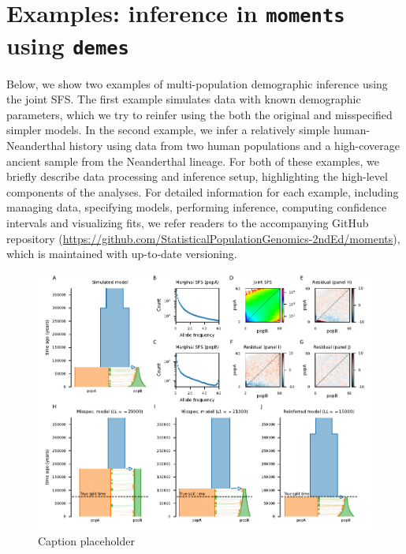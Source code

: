 \documentclass[]{article}
\newcommand{\moments}{\texttt{moments}\xspace}
\newcommand{\demes}{\texttt{demes}\xspace}
\begin{document}
\section*{Examples: inference in \moments using \demes}

Below, we show two examples of multi-population demographic inference using the
joint SFS. The first example simulates data with known demographic parameters,
which we try to reinfer using the both the original and misspecified simpler
models. In the second example, we infer a relatively simple human-Neanderthal
history using data from two human populations and a high-coverage ancient
sample from the Neanderthal lineage. For both of these examples, we briefly
describe data processing and inference setup, highlighting the high-level
components of the analyses. For detailed information for each example,
including managing data, specifying models, performing inference, computing
confidence intervals and visualizing fits, we refer readers to the accompanying
GitHub repository
(\url{https://github.com/StatisticalPopulationGenomics-2ndEd/moments}), which
is maintained with up-to-date versioning.

\begin{figure}[t!]
    \includegraphics{../example1/fig1.pdf}
    \caption{Caption placeholder}
    \label{fig:im}
\end{figure}
\end{document}
